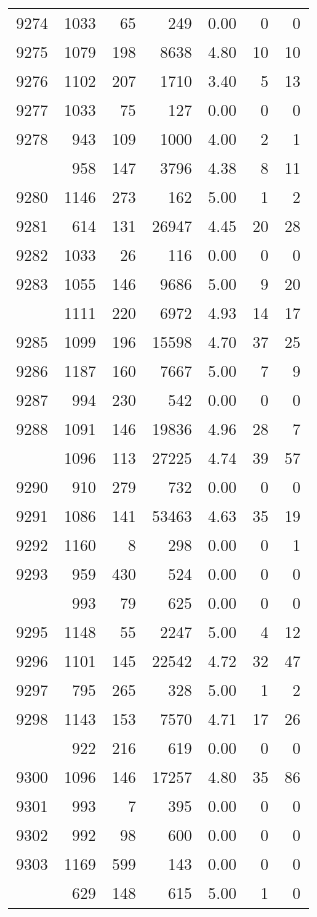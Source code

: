 \documentclass[
]{article}
\begin{document}
\begin{table}
\begin{tabular}[t]{lrrrrrr}
9274 & 1033 & 65 & 249 & 0.00 & 0 & 0\\
9275 & 1079 & 198 & 8638 & 4.80 & 10 & 10\\
9276 & 1102 & 207 & 1710 & 3.40 & 5 & 13\\
9277 & 1033 & 75 & 127 & 0.00 & 0 & 0\\
9278 & 943 & 109 & 1000 & 4.00 & 2 & 1\\
\addlinespace
9279 & 958 & 147 & 3796 & 4.38 & 8 & 11\\
9280 & 1146 & 273 & 162 & 5.00 & 1 & 2\\
9281 & 614 & 131 & 26947 & 4.45 & 20 & 28\\
9282 & 1033 & 26 & 116 & 0.00 & 0 & 0\\
9283 & 1055 & 146 & 9686 & 5.00 & 9 & 20\\
\addlinespace
9284 & 1111 & 220 & 6972 & 4.93 & 14 & 17\\
9285 & 1099 & 196 & 15598 & 4.70 & 37 & 25\\
9286 & 1187 & 160 & 7667 & 5.00 & 7 & 9\\
9287 & 994 & 230 & 542 & 0.00 & 0 & 0\\
9288 & 1091 & 146 & 19836 & 4.96 & 28 & 7\\
\addlinespace
9289 & 1096 & 113 & 27225 & 4.74 & 39 & 57\\
9290 & 910 & 279 & 732 & 0.00 & 0 & 0\\
9291 & 1086 & 141 & 53463 & 4.63 & 35 & 19\\
9292 & 1160 & 8 & 298 & 0.00 & 0 & 1\\
9293 & 959 & 430 & 524 & 0.00 & 0 & 0\\
\addlinespace
9294 & 993 & 79 & 625 & 0.00 & 0 & 0\\
9295 & 1148 & 55 & 2247 & 5.00 & 4 & 12\\
9296 & 1101 & 145 & 22542 & 4.72 & 32 & 47\\
9297 & 795 & 265 & 328 & 5.00 & 1 & 2\\
9298 & 1143 & 153 & 7570 & 4.71 & 17 & 26\\
\addlinespace
9299 & 922 & 216 & 619 & 0.00 & 0 & 0\\
9300 & 1096 & 146 & 17257 & 4.80 & 35 & 86\\
9301 & 993 & 7 & 395 & 0.00 & 0 & 0\\
9302 & 992 & 98 & 600 & 0.00 & 0 & 0\\
9303 & 1169 & 599 & 143 & 0.00 & 0 & 0\\
\addlinespace
9304 & 629 & 148 & 615 & 5.00 & 1 & 0\\

\end{tabular}
\end{table}
\end{document}
